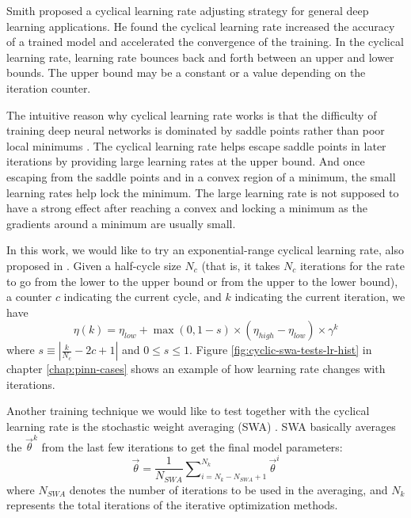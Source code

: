 Smith \cite{smith_cyclical_2017} proposed a cyclical learning rate adjusting strategy for general deep learning applications.
He found the cyclical learning rate increased the accuracy of a trained model and accelerated the convergence of the training.
In the cyclical learning rate, learning rate bounces back and forth between an upper and lower bounds.
The upper bound may be a constant or a value depending on the iteration counter.

The intuitive reason why cyclical learning rate works is that the difficulty of training deep neural networks is dominated by saddle points rather than poor local minimums \cite{dauphin_identifying_2014}.
The cyclical learning rate helps escape saddle points in later iterations by providing large learning rates at the upper bound.
And once escaping from the saddle points and in a convex region of a minimum, the small learning rates help lock the minimum.
The large learning rate is not supposed to have a strong effect after reaching a convex and locking a minimum as the gradients around a minimum are usually small.

In this work, we would like to try an exponential-range cyclical learning rate, also proposed in \cite{smith_cyclical_2017}.
Given a half-cycle size $N_c$ (that is, it takes $N_c$ iterations for the rate to go from the lower to the upper bound or from the upper to the lower bound), a counter $c$ indicating the current cycle, and $k$ indicating the current iteration, we have
\begin{equation}\label{eq:cyclical-learning-rate}
    \eta(k) = \eta_{low} + \max(0, 1-s)\times(\eta_{high}-\eta_{low})\times\gamma^k
\end{equation}
where $s \equiv \left\lvert \frac{k}{N_c} - 2c + 1\right\rvert$ and $0 \le s \le 1$.
Figure \ref{fig:cyclic-swa-tests-lr-hist} in chapter \ref{chap:pinn-cases} shows an example of how learning rate changes with iterations. 

Another training technique we would like to test together with the cyclical learning rate is the stochastic weight averaging (SWA) \cite{izmailov_averaging_2019}.
SWA basically averages the $\vec{\theta}^k$ from the last few iterations to get the final model parameters:
\begin{equation}
    \vec{\theta} = \frac{1}{N_{SWA}}\sum\nolimits_{i=N_k-N_{SWA}+1}^{N_k} \vec{\theta}^i
\end{equation}
where $N_{SWA}$ denotes the number of iterations to be used in the averaging, and $N_k$ represents the total iterations of the iterative optimization methods.

